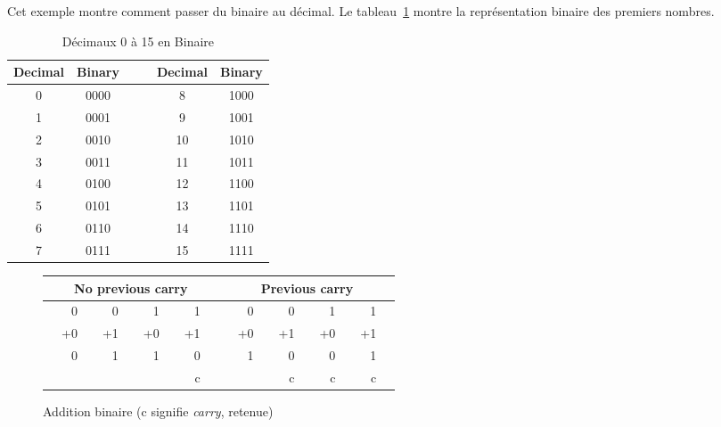 Cet exemple montre comment passer du binaire au décimal. Le
tableau~\ref{tab:dec-bin} montre la représentation binaire des premiers
nombres.
\begin{table}[t]
\begin{center}
\begin{tabular}{||c|c||cc||c|c||}
\hline
Decimal & Binary & & & Decimal & Binary \\
\hline
0       & 0000   & & & 8       & 1000 \\
\hline
1       & 0001   & & & 9       & 1001 \\
\hline
2       & 0010   & & & 10      & 1010 \\
\hline
3       & 0011   & & & 11      & 1011 \\
\hline
4       & 0100   & & & 12      & 1100 \\
\hline
5       & 0101   & & & 13      & 1101 \\
\hline
6       & 0110   & & & 14      & 1110 \\
\hline
7       & 0111   & & & 15      & 1111 \\
\hline
\end{tabular}
\caption{Décimaux 0 à 15 en Binaire\label{tab:dec-bin}}
\end{center}
\end{table}


\begin{figure}[h]
\begin{center}
\begin{tabular}{|rrrrrrrrp{.1cm}|p{.1cm}rrrrrrrr|}
\hline
& \multicolumn{7}{c}{No previous carry} & & & \multicolumn{7}{c}{Previous carry} & \\
\hline
&  0 & &  0 & &  1 & &  1 & & &  0 & &  0 & &  1 & & 1  & \\
& +0 & & +1 & & +0 & & +1 & & & +0 & & +1 & & +0 & & +1 &  \\
\cline{2-2} \cline{4-4} \cline{6-6} \cline{8-8} \cline{11-11} \cline{13-13} \cline{15-15} \cline{17-17}
& 0  & & 1  & & 1  & & 0  & & & 1  & & 0  & & 0  & & 1 & \\
&    & &    & &    & & c  & & &    & & c  & & c  & & c & \\
\hline
\end{tabular}

\caption{Addition binaire (c signifie \emph{carry}, retenue)\label{fig:bin-add}}
\end{center}
\end{figure}


